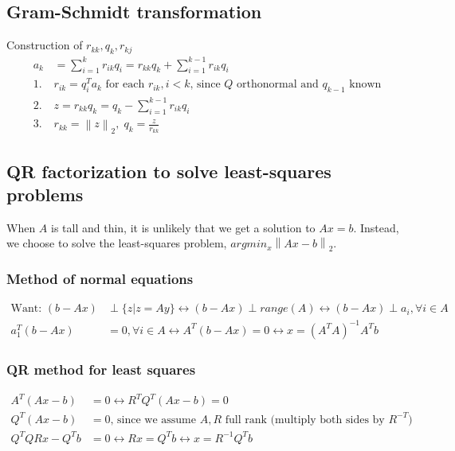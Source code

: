 \documentclass{article}
\newcommand{\norm}[2]{\left\lVert#1\right\rVert_#2}
\begin{document}
\subsection{Gram-Schmidt transformation}
Construction of $r_{kk}, q_k, r_{kj}$
\begin{align*}
    a_k &= \sum_{i=1}^kr_{ik}q_i = r_{kk}q_k + \sum_{i=1}^{k-1}r_{ik}q_i\\
    1. \; &r_{ik} = q_i^Ta_k \textrm{ for each $r_{ik}, i < k$, since $Q$ orthonormal and $q_{k-1}$ known}\\
    2. \; &z = r_{kk}q_k = q_k - \sum_{i=1}^{k-1}r_{ik}q_i\\
    3. \; & r_{kk} = \norm{z}{2}, \; q_k = \frac{z}{r_{kk}}
\end{align*}


\subsection{QR factorization to solve least-squares problems}
When $A$ is tall and thin, it is unlikely that we get a solution to $Ax = b$. Instead, we choose to solve the least-squares problem, $argmin_x\norm{Ax - b}{2}$. 

\subsubsection{Method of normal equations}
\begin{align*}
    \textrm{Want: } (b-Ax) &\perp \{z \vert z = Ay\} \longleftrightarrow (b-Ax) \perp range(A) \longleftrightarrow (b-Ax) \perp a_i, \forall i \in A\\
    a_1^T(b-Ax) &= 0, \forall i \in A \longleftrightarrow A^T(b-Ax) = 0 \longleftrightarrow x = (A^TA)^{-1}A^Tb
\end{align*}

\subsubsection{QR method for least squares}
\begin{align*}
    A^T(Ax-b) &= 0 \longleftrightarrow R^TQ^T(Ax-b) = 0\\
    Q^T(Ax-b) &= 0 \textrm{, since we assume $A, R$ full rank (multiply both sides by $R^{-T}$})\\
    Q^TQRx-Q^Tb &= 0 \longleftrightarrow Rx = Q^Tb \longleftrightarrow x = R^{-1}Q^Tb
\end{align*}
\end{document}
